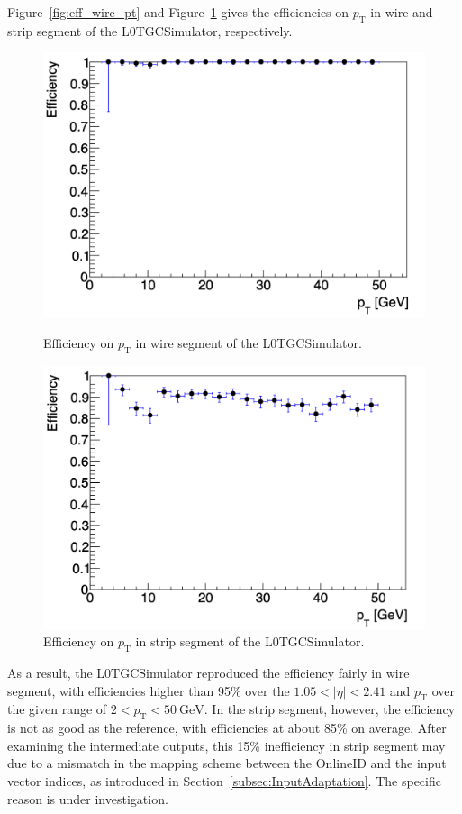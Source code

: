 Figure~\ref{fig:eff_wire_pt} and Figure~\ref{fig:eff_strip_pt} gives the efficiencies on $p_\mathrm{T}$ in wire and strip segment of the L0TGCSimulator, respectively. 

\begin{figure}[htbp]
  \begin{minipage}{0.50\textwidth}
    \centering
    \includegraphics[width=\linewidth]{figs/chapter5/eff_wire_pt_big.png}
    \caption{Efficiency on $p_\mathrm{T}$ in wire segment of the L0TGCSimulator.}
    \label{fig:eff_wire_pt}
  \end{minipage}
  \hfill
  \begin{minipage}{0.50\textwidth}
    \centering
    \includegraphics[width=\linewidth]{figs/chapter5/eff_strip_pt_big.png}
    \caption{Efficiency on $p_\mathrm{T}$ in strip segment of the L0TGCSimulator.}
    \label{fig:eff_strip_pt}
  \end{minipage}
\end{figure}

As a result, the L0TGCSimulator reproduced the efficiency fairly in wire segment, with efficiencies higher than 95\% over the $1.05 < |\eta| < 2.41$ and $p_\mathrm{T}$ over the given range of $2 < p_\mathrm{T} < 50~\text{GeV}$. In the strip segment, however, the efficiency is not as good as the reference, with efficiencies at about 85\% on average. After examining the intermediate outputs, this 15\% inefficiency in strip segment may due to a mismatch in the mapping scheme between the OnlineID and the input vector indices, as introduced in Section~\ref{subsec:InputAdaptation}. The specific reason is under investigation.